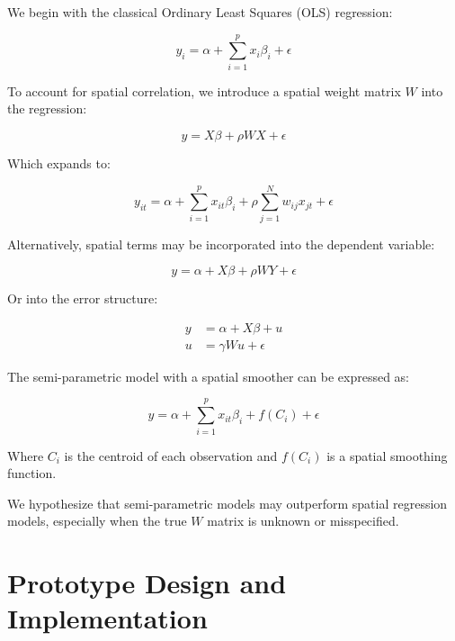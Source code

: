\documentclass{article}
\begin{document}
We begin with the classical Ordinary Least Squares (OLS) regression:

\begin{equation}
	y_i = \alpha + \sum^p_{i=1} x_i \beta_i + \epsilon
	\label{eq:OLS}
\end{equation}

To account for spatial correlation, we introduce a spatial weight matrix $W$ into the regression:

\begin{equation}
	y = X \beta + \rho W X + \epsilon
	\label{eq:SDM}
\end{equation}

Which expands to:

\begin{equation}
	y_{it} = \alpha + \sum^p_{i=1} x_{it} \beta_i + \rho \sum^N_{j=1} w_{ij} x_{jt} + \epsilon
	\label{eq:SDM_exp}
\end{equation}

Alternatively, spatial terms may be incorporated into the dependent variable:

\begin{equation}
	y = \alpha + X \beta + \rho W Y + \epsilon
	\label{eq:SAR}
\end{equation}

Or into the error structure:

\begin{equation}
	\begin{split}
		y & = \alpha + X \beta + u  \\
		u & = \gamma W u + \epsilon
	\end{split}
	\label{eq:SEM}
\end{equation}

The semi-parametric model with a spatial smoother can be expressed as:

\begin{equation}
	y = \alpha + \sum^p_{i=1} x_{it} \beta_i + f(C_i) + \epsilon
	\label{eq:tensor}
\end{equation}

Where $C_i$ is the centroid of each observation and $f(C_i)$ is a spatial smoothing function.

We hypothesize that semi-parametric models may outperform spatial regression models, especially when the true $W$ matrix is unknown or misspecified.

\section{Prototype Design and Implementation}
\end{document}
